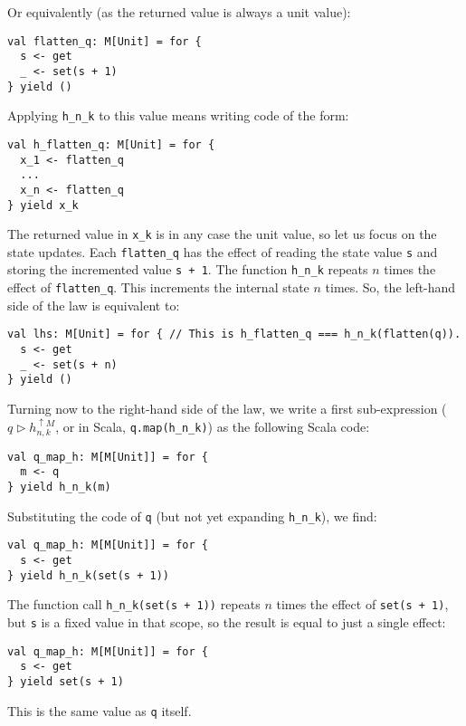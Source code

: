 Or equivalently (as the returned value is always a unit value):
\begin{lstlisting}
val flatten_q: M[Unit] = for {
  s <- get
  _ <- set(s + 1)
} yield ()
\end{lstlisting}
Applying \lstinline!h_n_k! to this value means writing code of the
form:
\begin{lstlisting}
val h_flatten_q: M[Unit] = for {
  x_1 <- flatten_q
  ...
  x_n <- flatten_q
} yield x_k
\end{lstlisting}
The returned value in \lstinline!x_k! is in any case the unit value,
so let us focus on the state updates. Each \lstinline!flatten_q!
has the effect of reading the state value \lstinline!s! and storing
the incremented value \lstinline!s + 1!. The function \lstinline!h_n_k!
repeats $n$ times the effect of \lstinline!flatten_q!. This increments
the internal state $n$ times. So, the left-hand side of the law is
equivalent to:
\begin{lstlisting}
val lhs: M[Unit] = for { // This is h_flatten_q === h_n_k(flatten(q)).
  s <- get
  _ <- set(s + n)
} yield ()
\end{lstlisting}

Turning now to the right-hand side of the law, we write a first sub-expression
($q\triangleright h_{n,k}^{\uparrow M}$, or in Scala, \lstinline!q.map(h_n_k)!)
as the following Scala code:
\begin{lstlisting}
val q_map_h: M[M[Unit]] = for {
  m <- q
} yield h_n_k(m)
\end{lstlisting}
Substituting the code of \lstinline!q! (but not yet expanding \lstinline!h_n_k!),
we find:
\begin{lstlisting}
val q_map_h: M[M[Unit]] = for {
  s <- get
} yield h_n_k(set(s + 1))
\end{lstlisting}
The function call \lstinline!h_n_k(set(s + 1))! repeats $n$ times
the effect of \lstinline!set(s + 1)!, but \lstinline!s! is a fixed
value in that scope, so the result is equal to just a single effect:
\begin{lstlisting}
val q_map_h: M[M[Unit]] = for {
  s <- get
} yield set(s + 1)
\end{lstlisting}
This is the same value as \lstinline!q! itself.

